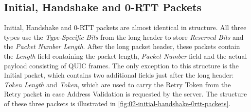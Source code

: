 \subsection{Initial, Handshake and 0-RTT Packets}

Initial, Handshake and 0-RTT packets are almost identical in structure. All three types use the
\textit{Type-Specific Bits} from the long header to store \textit{Reserved Bits} and the
\textit{Packet Number Length}. After the long packet header, these packets contain the
\textit{Length} field containing the packet length, \textit{Packet Number} field and the actual
payload consisting of QUIC frames. The only exception to this structure is the Initial packet, which
contains two additional fields just after the long header: \textit{Token Length} and \textit{Token},
which are used to carry the Retry Token from the Retry packet in case Address Validation is
requested by the server. The structure of these three packets is illustrated in
\autoref{fig:02-initial-handshake-0rtt-packets}.

